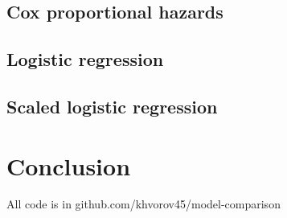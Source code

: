 \documentclass[12pt]{article}
\begin{document}
\subsection{Cox proportional hazards}



\subsection{Logistic regression}



\subsection{Scaled logistic regression}

\section{Conclusion}



\pagebreak

All code is in github.com/khvorov45/model-comparison
\end{document}

